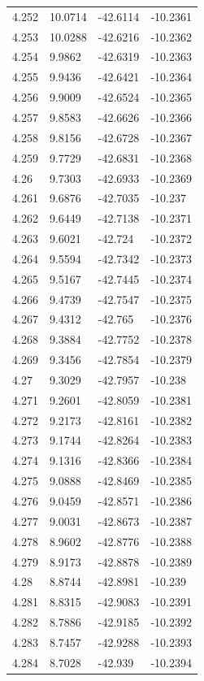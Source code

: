 \begin{tabular}{llll}
4.252 & 10.0714 & -42.6114 & -10.2361 \\
4.253 & 10.0288 & -42.6216 & -10.2362 \\
4.254 & 9.9862 & -42.6319 & -10.2363 \\
4.255 & 9.9436 & -42.6421 & -10.2364 \\
4.256 & 9.9009 & -42.6524 & -10.2365 \\
4.257 & 9.8583 & -42.6626 & -10.2366 \\
4.258 & 9.8156 & -42.6728 & -10.2367 \\
4.259 & 9.7729 & -42.6831 & -10.2368 \\
4.26 & 9.7303 & -42.6933 & -10.2369 \\
4.261 & 9.6876 & -42.7035 & -10.237 \\
4.262 & 9.6449 & -42.7138 & -10.2371 \\
4.263 & 9.6021 & -42.724 & -10.2372 \\
4.264 & 9.5594 & -42.7342 & -10.2373 \\
4.265 & 9.5167 & -42.7445 & -10.2374 \\
4.266 & 9.4739 & -42.7547 & -10.2375 \\
4.267 & 9.4312 & -42.765 & -10.2376 \\
4.268 & 9.3884 & -42.7752 & -10.2378 \\
4.269 & 9.3456 & -42.7854 & -10.2379 \\
4.27 & 9.3029 & -42.7957 & -10.238 \\
4.271 & 9.2601 & -42.8059 & -10.2381 \\
4.272 & 9.2173 & -42.8161 & -10.2382 \\
4.273 & 9.1744 & -42.8264 & -10.2383 \\
4.274 & 9.1316 & -42.8366 & -10.2384 \\
4.275 & 9.0888 & -42.8469 & -10.2385 \\
4.276 & 9.0459 & -42.8571 & -10.2386 \\
4.277 & 9.0031 & -42.8673 & -10.2387 \\
4.278 & 8.9602 & -42.8776 & -10.2388 \\
4.279 & 8.9173 & -42.8878 & -10.2389 \\
4.28 & 8.8744 & -42.8981 & -10.239 \\
4.281 & 8.8315 & -42.9083 & -10.2391 \\
4.282 & 8.7886 & -42.9185 & -10.2392 \\
4.283 & 8.7457 & -42.9288 & -10.2393 \\
4.284 & 8.7028 & -42.939 & -10.2394 \\

\end{tabular}
